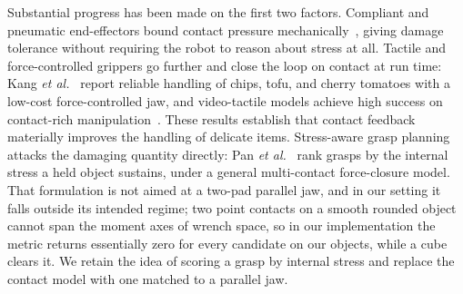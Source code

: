 Substantial progress has been made on the first two factors. Compliant and pneumatic
end-effectors bound contact pressure mechanically~\cite{wang2024softgripper}, giving damage
tolerance without requiring the robot to reason about stress at all. Tactile and
force-controlled grippers go further and close the loop on contact at run time: Kang
\emph{et al.}~\cite{kang2026learning} report reliable handling of chips, tofu, and cherry
tomatoes with a low-cost force-controlled jaw, and video-tactile models achieve high success
on contact-rich manipulation~\cite{vtam}. These results establish that contact feedback
materially improves the handling of delicate items. Stress-aware grasp planning attacks the
damaging quantity directly: Pan \emph{et al.}~\cite{pan2020stressmin} rank grasps by the
internal stress a held object sustains, under a general multi-contact force-closure model.
That formulation is not aimed at a two-pad parallel jaw, and in our setting it falls outside
its intended regime; two point contacts on a smooth rounded object cannot span the moment axes
of wrench space, so in our implementation the metric returns essentially zero for every
candidate on our objects, while a cube clears it. We retain the idea of scoring a grasp by
internal stress and replace the contact model with one matched to a parallel jaw.

